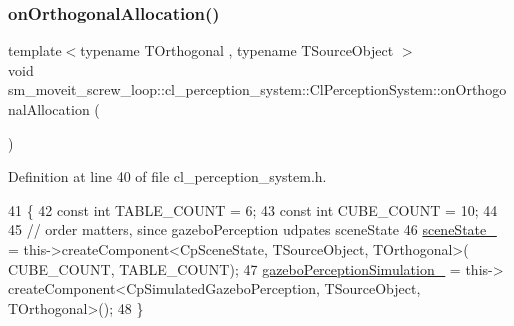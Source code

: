 \subsubsection{\texorpdfstring{on\+Orthogonal\+Allocation()}{onOrthogonalAllocation()}}
{\footnotesize\ttfamily template$<$typename T\+Orthogonal , typename T\+Source\+Object $>$ \\
void sm\+\_\+moveit\+\_\+screw\+\_\+loop\+::cl\+\_\+perception\+\_\+system\+::\+Cl\+Perception\+System\+::on\+Orthogonal\+Allocation (\begin{DoxyParamCaption}{ }\end{DoxyParamCaption})\hspace{0.3cm}{\ttfamily [inline]}}



Definition at line 40 of file cl\+\_\+perception\+\_\+system.\+h.


\begin{DoxyCode}
41             \{
42                 \textcolor{keyword}{const} \textcolor{keywordtype}{int} TABLE\_COUNT = 6;
43                 \textcolor{keyword}{const} \textcolor{keywordtype}{int} CUBE\_COUNT = 10;
44 
45                 \textcolor{comment}{// order matters, since gazeboPerception udpates sceneState}
46                 \hyperlink{classsm__moveit__screw__loop_1_1cl__perception__system_1_1ClPerceptionSystem_abb08b3cc6d4ec414a608da92133b1f66}{sceneState\_} = this->createComponent<CpSceneState, TSourceObject, TOrthogonal>(
      CUBE\_COUNT, TABLE\_COUNT);
47                 \hyperlink{classsm__moveit__screw__loop_1_1cl__perception__system_1_1ClPerceptionSystem_a45b844a21cd538d4c8e757bf706e6303}{gazeboPerceptionSimulation\_} = this->
      createComponent<CpSimulatedGazeboPerception, TSourceObject, TOrthogonal>();
48             \}
\end{DoxyCode}
\mbox{\label{classsm__moveit__screw__loop_1_1cl__perception__system_1_1ClPerceptionSystem_ae6355186bed36a732791854be792e200}} 
